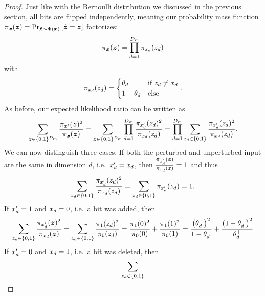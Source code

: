 \begin{proof}
Just like with the Bernoulli distribution we discussed in the previous section,  all bits are flipped independently, meaning our probability mass function
$\pi_{{\bm{x}}}({\bm{z}}) = \Pr_{\tilde{{\bm{z}}} \sim \Psi({\bm{x}})}\left[\tilde{{\bm{z}}} = {\bm{z}}\right]$
factorizes:
\begin{equation}
    \pi_{{\bm{x}}}({\bm{z}}) = \prod_{d=1}^{D_\mathrm{in}} \pi_{{x}_d}({z}_d)
\end{equation}
with
\begin{equation}
     \pi_{{x}_d}({z}_d) = 
    \begin{cases}
    {\theta}_d & \text{if } {z}_d \neq {x}_d\\
    1 - {\theta}_d & \text{else}\\
    \end{cases}.
\end{equation}
As before, our expected likelihood ratio can be written as 
\begin{equation}
    \sum_{{\bm{z}} \in \{0,1\}^{D_\mathrm{in}}} \frac{\pi_{{\bm{x}}'}({\bm{z}})^2}{\pi_{{\bm{x}}}({\bm{z}})}
    =
    \sum_{{\bm{z}} \in \{0,1\}^{D_\mathrm{in}}}
    \prod_{d=1}^{D_\mathrm{in}} \frac{\pi_{{x}'_d}({z}_d)^2}{\pi_{{x}_d}({z}_d)}
    =
    \prod_{d=1}^{D_\mathrm{in}}
    \sum_{{z}_d \in \{0,1\}}
     \frac{\pi_{{x}'_d}({z}_d)^2}{\pi_{{x}_d}({z}_d)}.
\end{equation}
We can now distinguish three cases.
If both the perturbed and unperturbed input are the same in dimension $d$, i.e.~${x}'_d = {x}_d$, then $\frac{\pi_{{x}'_d}({\bm{z}})}{\pi_{{x}_d}({\bm{z}})} = 1$ and thus 
\begin{equation}
\sum_{{z}_d \in \{0,1\}}
     \frac{\pi_{{x}'_d}({z}_d)^2}{\pi_{{x}_d}({z}_d)} 
     =
    \sum_{{z}_d \in \{0,1\}}
     \pi_{{x}'_d}({z}_d)
     = 1.
\end{equation}
If ${x}'_d = 1$ and ${x}_d = 0$, i.e.~a bit was added, then
\begin{equation}
\sum_{{z}_d \in \{0,1\}}
     \frac{\pi_{{x}'_d}({\bm{z}})^2}{\pi_{{x}_d}({\bm{z}})} 
     =
     \sum_{{z}_d \in \{0,1\}}
     \frac{\pi_{1}({z}_d)^2}{\pi_{0}({z}_d)} 
     =
     \frac{\pi_{1}(0)^2}{\pi_{0}(0)} 
     +
     \frac{\pi_{1}(1)^2}{\pi_{0}(1)} 
     = 
     \frac{\left({\theta}^{-}_d\right)^2}{1 - {\theta}^{+}_d}
     +
     \frac{\left(1 - {\theta}^{-}_d\right)^2}{{\theta}^{+}_d}
\end{equation}
If ${x}'_d = 0$ and ${x}_d = 1$, i.e.~a bit was deleted, then
\begin{equation}
\sum_{\evz_d \in \{0,1\}}

\end{equation}
\end{proof}
